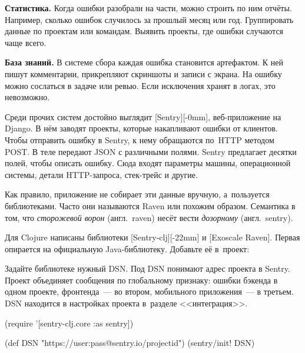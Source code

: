 \textbf{Статистика.} Когда ошибки разобрали на части, можно строить по ним
отчёты. Например, сколько ошибок случилось за прошлый месяц или
год. Группировать данные по проектам или командам. Выявить проекты, где ошибки
случаются чаще всего.

\textbf{База знаний.} В системе сбора каждая ошибка становится артефактом. К ней
пишут комментарии, прикрепляют скриншоты и записи с экрана. На ошибку можно
сослаться в задаче или ревью. Если исключения хранят в логах, это невозможно.


Среди прочих систем достойно выглядит [Sentry][-0mm],
веб-приложение на Django. В нём заводят проекты, которые накапливают ошибки
от клиентов. Чтобы отправить ошибку в Sentry, к нему обращаются по~HTTP методом
POST. В теле передают JSON с различными полями. Sentry предлагает десятки полей,
чтобы описать ошибку. Сюда входят параметры машины, операционной системы, детали
HTTP-запроса, стек-трейс и другие.


Как правило, приложение не собирает эти данные вручную, а~пользуется
библиотеками. Часто они называются Raven или похожим образом. Семантика в том,
что \emph{сторожевой ворон} (англ.~raven) несёт вести \emph{дозорному}
(англ.~sentry).

Для Clojure написаны библиотеки [Sentry-clj][-22mm] и
[Exoscale Raven]. Первая опирается на
официальную Java-библиотеку. Добавьте её в~проект:

\begin{english}
  \begin{clojure}
  \end{clojure}
\end{english}


Задайте библиотеке нужный DSN. Под DSN понимают адрес проекта в Sentry. Проект
объединяет сообщения по глобальному признаку: ошибки бэкенда в одном проекте,
фронтенда~--- во втором, мобильного приложения~--- в третьем. DSN находится в
настройках проекта в~разделе <<интеграция>>.

\ifx\devicetype\mobile

\begin{english}
  \begin{clojure}
(require '[sentry-clj.core :as sentry])

(def DSN
 "https://user:pass@sentry.io/projectid")
(sentry/init! DSN)
  \end{clojure}
\end{english}

